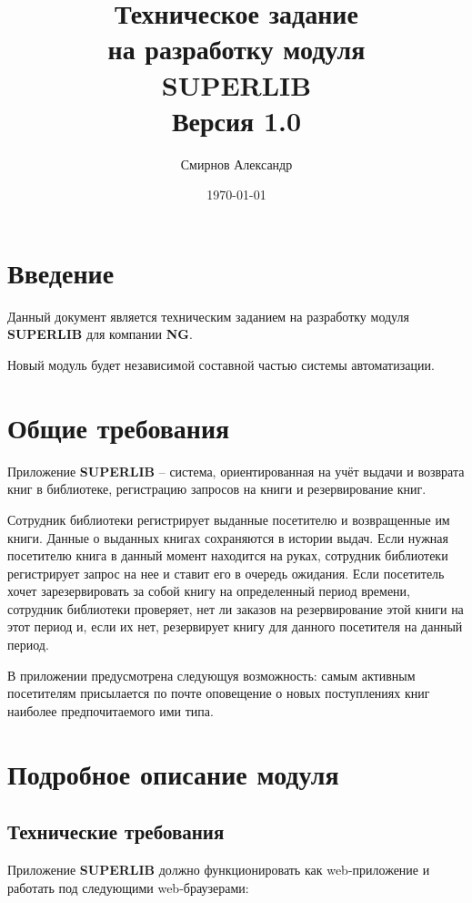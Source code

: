\documentclass[a4paper,10pt]{article}
\title{\textbf{Техническое задание \\ на разработку модуля \\ SUPERLIB} \\
       \large Версия 1.0}
\author{ Смирнов Александр }
\date{\today}
\begin{document}
    \maketitle


    \tableofcontents
    \newpage
     
    \section{Введение}

 
        Данный документ является техническим заданием на разработку модуля \textbf{SUPERLIB} для компании \textbf{NG}.  

         
        Новый модуль будет независимой составной частью системы автоматизации.

    \section{Общие требования}


        Приложение \textbf{SUPERLIB} -- система, ориентированная на учёт выдачи и возврата книг в библиотеке, регистрацию запросов на книги и резервирование книг. 

        Сотрудник библиотеки регистрирует выданные посетителю и возвращенные им книги. Данные о выданных книгах сохраняются в истории выдач. Если нужная посетителю книга в данный момент находится на руках, сотрудник библиотеки регистрирует запрос на нее и ставит его в очередь ожидания. Если посетитель хочет зарезервировать за собой книгу на определенный период времени, сотрудник библиотеки проверяет, нет ли заказов на резервирование этой книги на этот период и, если их нет, резервирует книгу для данного посетителя на данный период.  

        В приложении предусмотрена следующуя возможность: самым активным посетителям присылается по почте оповещение о новых поступлениях книг наиболее предпочитаемого ими типа.


    \newpage

    \section{Подробное описание модуля}

        \subsection{Технические требования}

         
            Приложение \textbf{SUPERLIB} должно функционировать как web-приложение и работать под следующими web-браузерами: 
             
\end{document}
